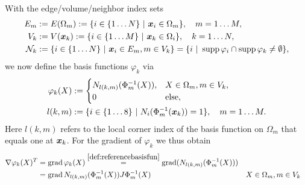 With the edge/volume/neighbor index sets
\begin{align}
	E_m &:= E(\Omega_m) := \{i\in\{1\ldots N\}~|~ \boldsymbol{x}_i\in\Omega_m\}, \quad m=1\ldots M,\\
	V_k &:= V(\boldsymbol{x}_k) := \{i\in\{1\ldots M\}~|~ \boldsymbol{x}_k\in\Omega_i\}, \quad k=1\ldots N,\\
	\mathcal{N}_k &:= \{i\in\{1\ldots N\}~|~ \boldsymbol{x}_i\in E_m, m\in V_k\} = \{i ~|~ \operatorname{supp}\varphi_i \cap \operatorname{supp}\varphi_k \neq\emptyset\},
\end{align}
we now define the basis functions $\varphi_k$ via
\begin{align}
	\varphi_k(X) &:= \begin{cases}
		N_{l(k,m)}(\Phi^{-1}_m(X)), & X\in\Omega_m, m\in V_k,\\
		0 & \text{else},	
	\end{cases}\label{def:referencebasisfun}\\
	l(k,m) &:= \{i\in\{1\ldots 8\}~|~ N_i(\Phi_m^{-1}(\boldsymbol{x}_k))=1\},\quad m=1\ldots M.
\end{align}
Here $l(k,m)$ refers to the local corner index of the basis function on $\Omega_m$ that equals one at $\boldsymbol{x}_k$.
For the gradient of $\varphi_k$ we thus obtain
\begin{align*}
	\nabla\varphi_k(X)^T &= \grad\varphi_k(X) \re{def:referencebasisfun} \grad (N_{l(k,m)}(\Phi^{-1}_m(X)))\\
					  &= \grad N_{l(k,m)}(\Phi^{-1}_m(X))J\Phi^{-1}_m(X) && X\in\Omega_m, m\in V_k
\end{align*}

